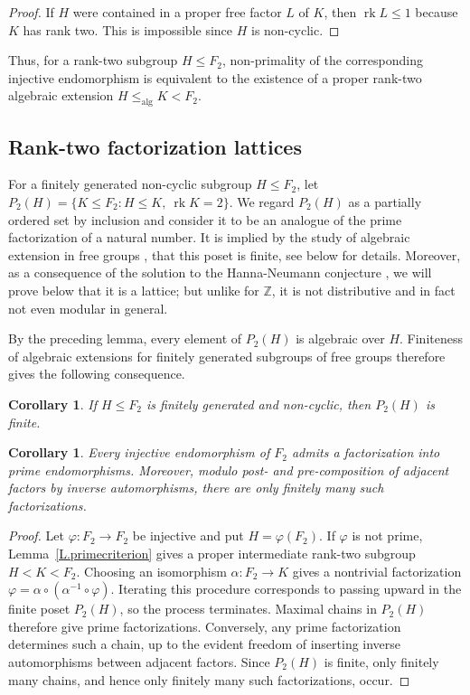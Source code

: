 \documentclass{amsproc}
\newtheorem{corollary}[theorem]{Corollary}
\newcommand{\rk}{\operatorname{rk}}
\newcommand{\alg}{\operatorname{alg}}
\begin{document}
\begin{proof}
If $H$ were contained in a proper free factor $L$ of $K$, then $\rk L\leq 1$
because $K$ has rank two.  This is impossible since $H$ is non-cyclic.
\end{proof}

Thus, for a rank-two subgroup $H\leq F_2$, non-primality of the corresponding
injective endomorphism is equivalent to the existence of a proper rank-two
algebraic extension $H\leq_{\alg}K<F_2$.

\subsection{Rank-two factorization lattices}

For a finitely generated non-cyclic subgroup $H\leq F_2$, let
$P_2(H)=\{K\leq F_2: H\leq K,\ \rk K=2\}$.  We regard $P_2(H)$ as a partially
ordered set by inclusion and consider it to be an analogue of the prime factorization of a natural number. It is implied by the study of algebraic extension in free groups \cite{MVW}, that this poset is finite, see below for details. Moreover, as a consequence of the solution to the Hanna-Neumann conjecture \cites{Mineyev,Friedman},
we will prove below that it is a lattice; but unlike for $\mathbb Z$, it is not distributive and in fact not even modular in general.

\medskip

By the preceding lemma, every element of $P_2(H)$ is algebraic over $H$.
Finiteness of algebraic extensions for finitely generated subgroups of free
groups \cite{MVW} therefore gives the following consequence.

\begin{corollary}
If $H\leq F_2$ is finitely generated and non-cyclic, then $P_2(H)$ is finite. 
\end{corollary}

\begin{corollary}
Every injective endomorphism of $F_2$ admits a factorization into prime
endomorphisms. Moreover, modulo post- and pre-composition of adjacent factors by inverse automorphisms,
there are only finitely many such factorizations.
\end{corollary}

\begin{proof}
Let $\varphi\colon F_2\to F_2$ be injective and put $H=\varphi(F_2)$.  If
$\varphi$ is not prime, Lemma~\ref{L.primecriterion} gives a proper
intermediate rank-two subgroup $H<K<F_2$.  Choosing an isomorphism
$\alpha\colon F_2\to K$ gives a nontrivial factorization
$\varphi=\alpha\circ(\alpha^{-1}\circ\varphi)$.  Iterating this procedure
corresponds to passing upward in the finite poset $P_2(H)$, so the process
terminates.  Maximal chains in $P_2(H)$ therefore give prime factorizations.
Conversely, any prime factorization determines such a chain, up to the evident
freedom of inserting inverse automorphisms between adjacent factors.  Since
$P_2(H)$ is finite, only finitely many chains, and hence only finitely many
such factorizations, occur.
\end{proof}
\end{document}
